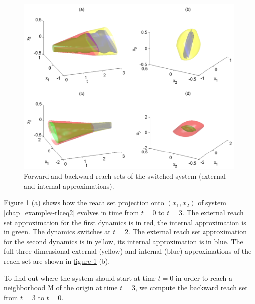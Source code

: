 \documentclass[letterpaper,10pt,english]{sphinxmanual}
\begin{document}
\begin{figure}[htbp]
\centering
\capstart

\includegraphics{rlcreach.png}
\caption{Forward and backward reach sets of the switched system
(external and internal approximations).}\label{chap_examples:rlcreachfig}\end{figure}

\hyperref[chap_examples:rlcreachfig]{Figure  \ref*{chap_examples:rlcreachfig}} (a) shows how the reach set projection onto
$(x_1, x_2)$ of system \eqref{chap_examples-rlceq2} evolves in time from $t=0$
to $t=3$. The external reach set approximation for the first
dynamics is in red, the internal approximation is in green. The dynamics
switches at $t=2$. The external reach set approximation for the
second dynamics is in yellow, its internal approximation is in blue. The
full three-dimensional external (yellow) and internal (blue)
approximations of the reach set are shown in \hyperref[chap_examples:rlcreachfig]{figure  \ref*{chap_examples:rlcreachfig}} (b).

To find out where the system should start at time $t=0$ in order
to reach a neighborhood M of the origin at time $t=3$, we compute
the backward reach set from $t=3$ to $t=0$.
\end{document}
